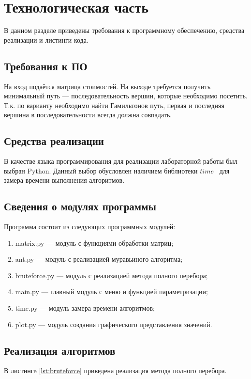 \section{Технологическая часть}
В данном разделе приведены требования к программному обеспечению, средства реализации и листинги кода.

\subsection{Требования к ПО}
На вход подаётся матрица стоимостей.
На выходе требуется получить минимальный путь --- последовательность вершин, которые необходимо посетить.
Т.к. по варианту необходимо найти Гамильтонов путь, первая и последняя вершина в последовательности всегда должна совпадать.

\subsection{Средства реализации}

В качестве языка программирования для реализации лабораторной работы был выбран Python.
Данный выбор обусловлен наличием библиотеки $time$~\cite{time} для замера времени выполнения алгоритмов.

\subsection{Сведения о модулях программы}
Программа состоит из следующих программных модулей:
\begin{enumerate}[label={\arabic*)}]
	\item matrix.py --- модуль с функциями обработки матриц;
	\item ant.py --- модуль с реализацией муравьиного алгоритма;
	\item bruteforce.py --- модуль с реализацией метода полного перебора;
	\item main.py --- главный модуль с меню и функцией параметризации;
	\item time.py --- модуль замера времени алгоритмов;
	\item plot.py --- модуль создания графического представления значений.
\end{enumerate}

\newpage
\subsection{Реализация алгоритмов}

В листингe \ref{lst:bruteforce} приведена реализация метода полного перебора.

